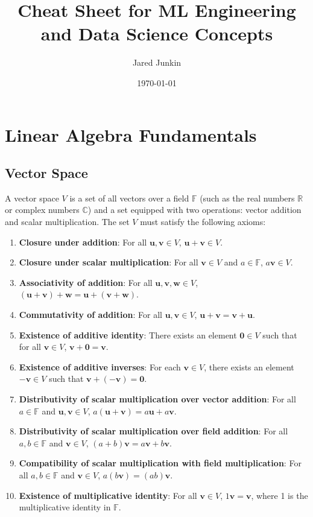 \documentclass[12pt]{article}
\title{Cheat Sheet for ML Engineering and Data Science Concepts}
\author{Jared Junkin}
\date{\today}
\begin{document}
\maketitle
\tableofcontents
\newpage

\section{Linear Algebra Fundamentals}


\subsection{Vector Space}
A vector space \(V\) is a set of all vectors over a field \(\mathbb{F}\) (such as the real numbers \(\mathbb{R}\) or complex numbers \(\mathbb{C}\)) and a set equipped with two operations: vector addition and scalar multiplication. The set \(V\) must satisfy the following axioms:
\begin{enumerate}
\item \textbf{Closure under addition}: For all \(\mathbf{u}, \mathbf{v} \in V\), \(\mathbf{u} + \mathbf{v} \in V\).
\item \textbf{Closure under scalar multiplication}: For all \(\mathbf{v} \in V\) and \(a \in \mathbb{F}\), \(a\mathbf{v} \in V\).
\item \textbf{Associativity of addition}: For all \(\mathbf{u}, \mathbf{v}, \mathbf{w} \in V\), \((\mathbf{u} + \mathbf{v}) + \mathbf{w} = \mathbf{u} + (\mathbf{v} + \mathbf{w})\).
\item \textbf{Commutativity of addition}: For all \(\mathbf{u}, \mathbf{v} \in V\), \(\mathbf{u} + \mathbf{v} = \mathbf{v} + \mathbf{u}\).
\item \textbf{Existence of additive identity}: There exists an element \(\mathbf{0} \in V\) such that for all \(\mathbf{v} \in V\), \(\mathbf{v} + \mathbf{0} = \mathbf{v}\).
\item \textbf{Existence of additive inverses}: For each \(\mathbf{v} \in V\), there exists an element \(-\mathbf{v} \in V\) such that \(\mathbf{v} + (-\mathbf{v}) = \mathbf{0}\).
\item \textbf{Distributivity of scalar multiplication over vector addition}: For all \(a \in \mathbb{F}\) and \(\mathbf{u}, \mathbf{v} \in V\), \(a(\mathbf{u} + \mathbf{v}) = a\mathbf{u} + a\mathbf{v}\).
\item \textbf{Distributivity of scalar multiplication over field addition}: For all \(a, b \in \mathbb{F}\) and \(\mathbf{v} \in V\), \((a + b)\mathbf{v} = a\mathbf{v} + b\mathbf{v}\).
\item \textbf{Compatibility of scalar multiplication with field multiplication}: For all \(a, b \in \mathbb{F}\) and \(\mathbf{v} \in V\), \(a(b\mathbf{v}) = (ab)\mathbf{v}\).
\item \textbf{Existence of multiplicative identity}: For all \(\mathbf{v} \in V\), \(1\mathbf{v} = \mathbf{v}\), where 1 is the multiplicative identity in \(\mathbb{F}\).
\end{enumerate}
\end{document}
